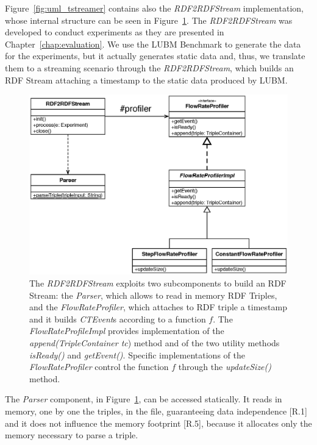 \noindent Figure~\ref{fig:uml_tstreamer} contains also the \textit{RDF2RDFStream} implementation, whose internal structure can be seen in Figure~\ref{fig:uml_flowrateprofiler}. The \textit{RDF2RDFStream} was developed to conduct experiments as they are presented in Chapter~\ref{chap:evaluation}.  We use the LUBM Benchmark to generate the data for the experiments, but it actually generates static data and, thus, we translate them to a streaming scenario through the \textit{RDF2RDFStream}, which builds an RDF Stream attaching a timestamp to the static data produced by LUBM. %

\begin{figure}[tbh]
  \centering
	\includegraphics[width=0.75\linewidth]{images/uml_flowrateprofiler}
	\caption[Internal Components of \textit{RDF2RDFStream} - UML Schema]{The \textit{RDF2RDFStream} exploits two subcomponents to build an RDF Stream: the \textit{Parser}, which allows to read in memory RDF Triples, and the \textit{FlowRateProfiler}, which attaches to RDF triple a timestamp and it builds \textit{CTEvent}s according to a function $f$. The \textit{FlowRateProfileImpl} provides implementation of the \textit{append(TripleContainer tc}) method and of the two utility methods \textit{isReady()} and \textit{getEvent()}. Specific implementations of the \textit{FlowRateProfiler} control the function $f$ through the \textit{updateSize()} method.} 
  	\label{fig:uml_flowrateprofiler}
\end{figure}


The \textit{Parser} component, in Figure~\ref{fig:uml_flowrateprofiler}, can be accessed statically. It reads in memory, one by one the triples, in the file, guaranteeing data independence [R.1] and it does not influence the memory footprint [R.5], because it allocates only the memory necessary to parse a triple. 

